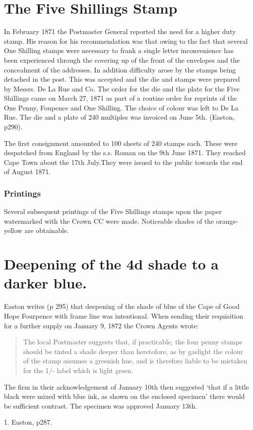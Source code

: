\section{The Five Shillings Stamp}

 
In February 1871 the Postmaster General reported the need for a 
higher duty stamp. His reason for his recommendation was that 
owing to the fact that several One Shilling stamps were necessary 
to frank a single letter inconvenience has been experienced through 
the covering up of the front of the envelopes and the concealment 
of the addresses. In addition difficulty arose by the stamps being 
detached in the post.
This was accepted and the die and stamps were prepared by Messrs. 
De La Rue and Co. The order for the die and the plate for the
Five Shillings came on March 27, 1871 as part of a routine order
for reprints of the One Penny, Foupence and One Shilling. The
choice of colour was left to De La Rue. The die and a plate
of 240 multiples was invoiced on June 5th. (Easton, p290).


The first consignment amounted to 100 sheets of 240 stamps each. 
These were despatched from England by the s.s. Roman on the 9th June 1871. 
They reached Cape Town about the 17th July.They were issued to the public 
towards the end of August 1871.

\subsubsection{Printings}

Several subsequent printings of the Five Shillings stamps upon the 
paper watermarked with the Crown CC were made. Noticeable shades 
of the orange-yellow are obtainable.


\section{Deepening of the 4d shade to a darker blue.}

Easton writes (p 295) that deepening of the shade of blue of the Cape of Good Hope
Fourpence with frame line was intentional. When sending their requisition for a further supply on January 9, 1872 the Crown Agents wrote:

\begin{quotation}
The local Postmaster suggests that, if practicable, the four penny stamps should be tinted a shade deeper than heretofore, as by gaslight the colour of the stamp assumes
a greenish hue, and is therefore liable to be mistaken for the 1/- label which
is light green.
\end{quotation}

The firm in their acknowledgement of January 10th then suggested `that if a little
black were mixed with blue ink, as shown on the enclosed specimen' there would be
sufficient contrast. The specimen was approved January 13th. 




1. Easton, p287. 



                                                                                                              
